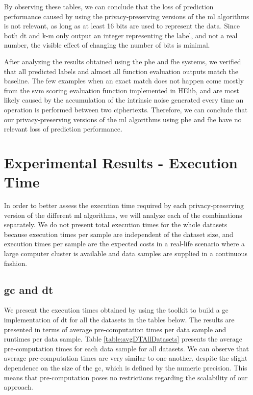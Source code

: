 By observing these tables, we can conclude that the loss of prediction performance caused by using the privacy-preserving versions of the \ac{ml} algorithms is not relevant, as long as at least 16 bits are used to represent the data. Since both \ac{dt} and \ac{k-m} only output an integer representing the label, and not a real number, the visible effect of changing the number of bits is minimal.

After analyzing the results obtained using the \ac{phe} and \ac{fhe} systems, we verified that all predicted labels and almost all function evaluation outputs match the baseline. The few examples when an exact match does not happen come mostly from the \ac{svm} scoring evaluation function implemented in HElib, and are most likely caused by the accumulation of the intrinsic noise generated every time an operation is performed between two ciphertexts. Therefore, we can conclude that our privacy-preserving versions of the \ac{ml} algorithms using \ac{phe} and \ac{fhe} have no relevant loss of prediction performance.

\section{Experimental Results - Execution Time}
\label{sec:ExperimentalResultsExecutionTime}

In order to better assess the execution time required by each privacy-preserving version of the different \ac{ml} algorithms, we will analyze each of the combinations separately. We do not present total execution times for the whole datasets because execution times per sample are independent of the dataset size, and execution times per sample are the expected costs in a real-life scenario where a large computer cluster is available and data samples are supplied in a continuous fashion.


\subsection{\acl{gc} and \acl{dt}}

We present the execution times obtained by using the toolkit to build a \ac{gc} implementation of \ac{dt} for all the datasets in the tables below. The results are presented in terms of average pre-computation times per data sample and runtimes per data sample. Table \ref{table:avgDTAllDatasets} presents the average pre-computation times for each data sample for all datasets. We can observe that average pre-computation times are very similar to one another, despite the slight dependence on the size of the \ac{gc}, which is defined by the numeric precision. This means that pre-computation poses no restrictions regarding the scalability of our approach.


